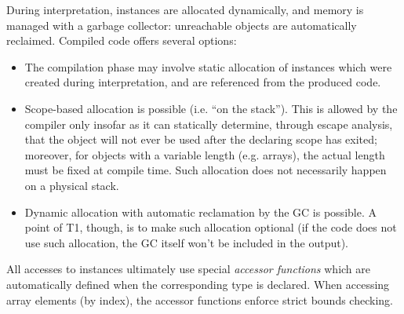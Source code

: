 During interpretation, instances are allocated dynamically, and memory
is managed with a garbage collector: unreachable objects are
automatically reclaimed. Compiled code offers several options:
\begin{itemize}

    \item The compilation phase may involve static allocation of
    instances which were created during interpretation, and are
    referenced from the produced code.

    \item Scope-based allocation is possible (i.e. ``on the stack'').
    This is allowed by the compiler only insofar as it can statically
    determine, through escape analysis, that the object will not ever be
    used after the declaring scope has exited; moreover, for objects
    with a variable length (e.g. arrays), the actual length must be
    fixed at compile time. Such allocation does not necessarily happen
    on a physical stack.

    \item Dynamic allocation with automatic reclamation by the GC is
    possible. A point of T1, though, is to make such allocation optional
    (if the code does not use such allocation, the GC itself won't be
    included in the output).

\end{itemize}

All accesses to instances ultimately use special \emph{accessor
functions} which are automatically defined when the corresponding type
is declared. When accessing array elements (by index), the accessor
functions enforce strict bounds checking.
